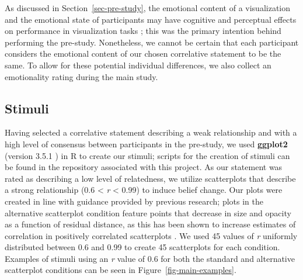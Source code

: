 \documentclass[manuscript,screen,review,anonymous]{acmart}
\begin{document}
As discussed in Section~\ref{sec-pre-study}, the emotional content of a
visualization and the emotional state of participants may have cognitive
and perceptual effects on performance in visualization tasks
\citep{phelps_2006, harrison_2013, thoresen_2016}; this was the primary
intention behind performing the pre-study. Nonetheless, we cannot be
certain that each participant considers the emotional content of our
chosen correlative statement to be the same. To allow for these
potential individual differences, we also collect an emotionality rating
during the main study.

\subsection{Stimuli}\label{sec-stimuli-main}

Having selected a correlative statement describing a weak relationship
and with a high level of consensus between participants in the
pre-study, we used \textbf{ggplot2} (version 3.5.1 \citep{ggplot}) in R
to create our stimuli; scripts for the creation of stimuli can be found
in the repository associated with this project. As our statement was
rated as describing a low level of relatedness, we utilize scatterplots
that describe a strong relationship (0.6 \textless{} \emph{r}
\textless{} 0.99) to induce belief change. Our plots were created in
line with guidance provided by previous research; plots in the
alternative scatterplot condition feature points that decrease in size
and opacity as a function of residual distance, as this has been shown
to increase estimates of correlation in positively correlated
scatterplots \citep{strain_2023, strain_2023b, strain_2024}. We used 45
values of \emph{r} uniformly distributed between 0.6 and 0.99 to create
45 scatterplots for each condition. Examples of stimuli using an
\emph{r} value of 0.6 for both the standard and alternative scatterplot
conditions can be seen in Figure~\ref{fig-main-examples}.
\end{document}
